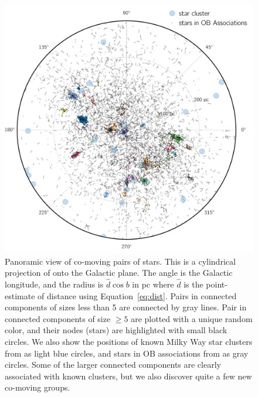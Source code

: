 \documentclass[manuscript, letterpaper]{aastex6}
\newcommand{\eqname}{Equation}
\begin{document}
\begin{figure}[htbp]
  \begin{center}
    \includegraphics[width=\textwidth]{figures/glon_d_pie.pdf}
  \end{center}
  \caption{%
    Panoramic view of co-moving pairs of stars. This is a cylindrical
    projection of onto the Galactic plane. The angle is the Galactic
    longitude, and the radius is $\hat d\cos b$ in pc where $\hat d$ is the point-estimate
    of distance using \eqname~\ref{eq:dist}.
    Pairs in connected components of sizes less than 5 are connected by gray lines.
    Pair in connected components of size $\geq 5$ are plotted with a unique random color,
    and their nodes (stars) are highlighted with small black circles.
    We also show the positions of known Milky Way star clusters
    from \citet{Kharchenko:2016aa} as light blue circles,
    and stars in OB associations from \citet{de-Zeeuw:1999aa} as
    gray circles.
    Some of the larger connected components are clearly associated with known
    clusters, but we also discover quite a few new co-moving groups.
    \label{fig:glon_d_pairlines}}
\end{figure}
\end{document}
